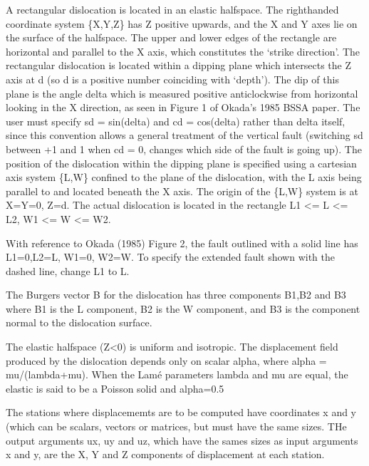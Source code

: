 \documentclass[letterpaper,10pt,english]{sphinxmanual}
\begin{document}
\sphinxAtStartPar
A rectangular dislocation is located in an elastic halfspace. The right\sphinxhyphen{}handed coordinate system \{X,Y,Z\} has Z positive
upwards, and the X and Y axes lie on the surface of the halfspace. The upper and lower edges of the rectangle are
horizontal and parallel to the X axis, which constitutes the ‘strike direction’. The rectangular dislocation is located
within a dipping plane which intersects the Z axis at \sphinxhyphen{}d (so d is a positive number coinciding with ‘depth’). The dip
of this plane is the angle delta which is measured positive anticlockwise from horizontal looking in the \sphinxhyphen{}X direction,
as seen in Figure 1 of Okada’s 1985 BSSA paper. The user must specify sd = sin(delta) and cd = cos(delta) rather than
delta itself, since this convention allows a general treatment of the vertical fault (switching sd between +1 and \sphinxhyphen{}1
when cd = 0, changes which side of the fault is going up). The position of the dislocation within the dipping plane is
specified using a cartesian axis system \{L,W\} confined to the plane of the dislocation, with the L axis being parallel
to and located beneath the X axis. The origin of the \{L,W\} system is at X=Y=0, Z=\sphinxhyphen{}d. The actual dislocation is located
in the rectangle L1 \textless{}= L \textless{}= L2, W1 \textless{}= W \textless{}= W2.

\sphinxAtStartPar
With reference to Okada (1985) Figure 2, the fault outlined with a solid line has L1=0,L2=L, W1=0, W2=W. To specify the
extended fault shown with the dashed line, change L1 to \sphinxhyphen{}L.

\sphinxAtStartPar
The Burgers vector B for the dislocation has three components B1,B2 and B3 where B1 is the L component, B2 is the W
component, and B3 is the component normal to the dislocation surface.

\sphinxAtStartPar
The elastic half\sphinxhyphen{}space (Z\textless{}0) is uniform and isotropic. The displacement field produced by the dislocation depends only
on scalar alpha, where alpha = mu/(lambda+mu). When the Lamé parameters lambda and mu are equal, the elastic is said to
be a Poisson solid and alpha=0.5

\sphinxAtStartPar
The stations where displacememts are to be computed have coordinates x and y (which can be scalars, vectors or
matrices, but must have the same sizes. THe output arguments ux, uy and uz, which have the sames sizes as input
arguments x and y, are the X, Y and Z components of displacement at each station.
\end{document}
